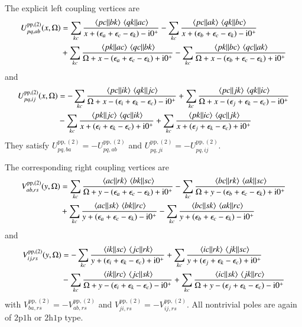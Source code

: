 \documentclass[aip,jcp,reprint,noshowkeys,superscriptaddress]{revtex4-1}
\newcommand{\eps}{\epsilon}
\newcommand{\ii}{\mathrm{i}}
\newcommand{\hhp}{\text{2h1p}}
\newcommand{\pph}{\text{2p1h}}
\newcommand{\pp}{\text{pp}}
\begin{document}
The explicit left coupling vertices are
\begin{equation}
\begin{split}
U_{pq,ab}^{\pp,(2)}(x,\Omega)
&=
\sum_{kc}
\frac{\mel{pc}{}{bk}\mel{qk}{}{ac}}
{x+(\eps_a+\eps_c-\eps_k)-\ii0^+}
-
\sum_{kc}
\frac{\mel{pc}{}{ak}\mel{qk}{}{bc}}
{x+(\eps_b+\eps_c-\eps_k)-\ii0^+}
\\
&+
\sum_{kc}
\frac{\mel{pk}{}{ac}\mel{qc}{}{bk}}
{\Omega+x-(\eps_a+\eps_c-\eps_k)+\ii0^+}
-
\sum_{kc}
\frac{\mel{pk}{}{bc}\mel{qc}{}{ak}}
{\Omega+x-(\eps_b+\eps_c-\eps_k)+\ii0^+}
\end{split}
\label{eq:U_pp_second_ab}
\end{equation}
and
\begin{equation}
\begin{split}
U_{pq,ij}^{\pp,(2)}(x,\Omega)
&=
-
\sum_{kc}
\frac{\mel{pc}{}{ik}\mel{qk}{}{jc}}
{\Omega+x-(\eps_i+\eps_k-\eps_c)-\ii0^+}
+
\sum_{kc}
\frac{\mel{pc}{}{jk}\mel{qk}{}{ic}}
{\Omega+x-(\eps_j+\eps_k-\eps_c)-\ii0^+}
\\
&-
\sum_{kc}
\frac{\mel{pk}{}{jc}\mel{qc}{}{ik}}
{x+(\eps_i+\eps_k-\eps_c)+\ii0^+}
+
\sum_{kc}
\frac{\mel{pk}{}{ic}\mel{qc}{}{jk}}
{x+(\eps_j+\eps_k-\eps_c)+\ii0^+}
\end{split}
\label{eq:U_pp_second_ij}
\end{equation}
They satisfy
$U_{pq,ba}^{\pp,(2)}=-U_{pq,ab}^{\pp,(2)}$ and
$U_{pq,ji}^{\pp,(2)}=-U_{pq,ij}^{\pp,(2)}$.

The corresponding right coupling vertices are
\begin{equation}
\begin{split}
V_{ab,rs}^{\pp,(2)}(y,\Omega)
&=
\sum_{kc}
\frac{\mel{ac}{}{rk}\mel{bk}{}{sc}}
{\Omega+y-(\eps_a+\eps_c-\eps_k)+\ii0^+}
-
\sum_{kc}
\frac{\mel{bc}{}{rk}\mel{ak}{}{sc}}
{\Omega+y-(\eps_b+\eps_c-\eps_k)+\ii0^+}
\\
&+
\sum_{kc}
\frac{\mel{ac}{}{sk}\mel{bk}{}{rc}}
{y+(\eps_a+\eps_c-\eps_k)-\ii0^+}
-
\sum_{kc}
\frac{\mel{bc}{}{sk}\mel{ak}{}{rc}}
{y+(\eps_b+\eps_c-\eps_k)-\ii0^+}
\end{split}
\label{eq:V_pp_second_ab}
\end{equation}
and
\begin{equation}
\begin{split}
V_{ij,rs}^{\pp,(2)}(y,\Omega)
&=
-
\sum_{kc}
\frac{\mel{ik}{}{sc}\mel{jc}{}{rk}}
{y+(\eps_i+\eps_k-\eps_c)+\ii0^+}
+
\sum_{kc}
\frac{\mel{ic}{}{rk}\mel{jk}{}{sc}}
{y+(\eps_j+\eps_k-\eps_c)+\ii0^+}
\\
&-
\sum_{kc}
\frac{\mel{ik}{}{rc}\mel{jc}{}{sk}}
{\Omega+y-(\eps_i+\eps_k-\eps_c)-\ii0^+}
+
\sum_{kc}
\frac{\mel{ic}{}{sk}\mel{jk}{}{rc}}
{\Omega+y-(\eps_j+\eps_k-\eps_c)-\ii0^+}
\end{split}
\label{eq:V_pp_second_ij}
\end{equation}
with
$V_{ba,rs}^{\pp,(2)}=-V_{ab,rs}^{\pp,(2)}$ and
$V_{ji,rs}^{\pp,(2)}=-V_{ij,rs}^{\pp,(2)}$.
All nontrivial poles are again of $\pph$ or $\hhp$ type.
\end{document}
